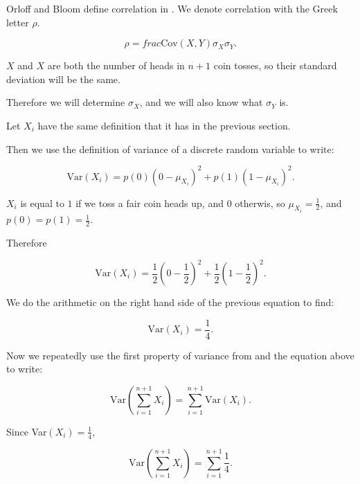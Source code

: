 \documentclass[a4paper,11pt]{article}
\begin{document}
Orloff and Bloom define correlation in \cite{reading7b}. We denote correlation
with the Greek letter $\rho$.


\begin{equation}
\rho = frac{\text{Cov} \left(X, Y \right) } {\sigma_X \sigma_Y}.
\end{equation}

$X$ and $X$ are both the number of heads in $n+1$ coin tosses, so their
standard deviation will be the same.

Therefore we will determine $\sigma_X$, and we will also know what $\sigma_Y$
is.

Let $X_i$ have the same definition that it has in the previous section.

Then  we use the definition of variance of a discrete random variable 
\cite{reading5a} to write:

\begin{equation}
\text{Var}\left(X_i\right) = p\left(0 \right) \left(0-\mu_{X_i}\right)^2
     + p\left(1 \right) \left(1-\mu_{X_i}\right)^2.
\end{equation}

$X_i$ is equal to $1$ if we toss a fair coin heads up, and $0$ otherwis,
so $\mu_{X_i} = \frac{1}{2}$, and 
$p\left(0\right) = p\left(1 \right) = \frac{1}{2}$.

Therefore 

\begin{equation}
\text{Var}\left(X_i\right) = \frac{1}{2} \left(0-\frac{1}{2} \right)^2
     + \frac{1}{2} \left(1-\frac{1}{2} \right)^2.
\end{equation}

We do the arithmetic on the right hand side of the previous equation to
find:

\begin{equation}
\text{Var}\left(X_i\right) = \frac{1}{4}.
\end{equation}


Now we repeatedly use the first property of variance from \cite{reading5a}
and the equation above to write:

\begin{equation}
\text{Var}\left( \sum_{i=1}^{n+1} X_i \right) = 
     \sum_{i=1}^{n+1} \text{Var}\left(X_i \right).
\end{equation}

Since Var$\left(X_i \right) = \frac{1}{4}$, 

\begin{equation}
\text{Var}\left( \sum_{i=1}^{n+1} X_i \right) = 
     \sum_{i=1}^{n+1} \frac{1}{4}.
\end{equation}
\end{document}
